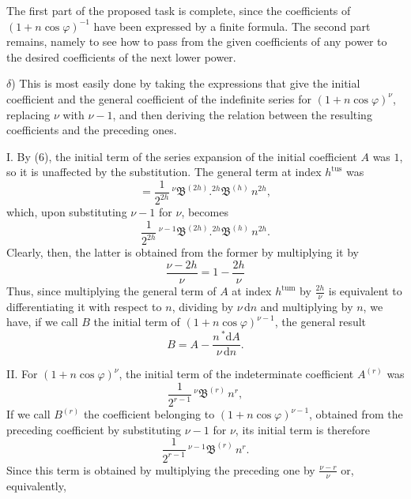 The first part of the proposed task is complete, since the coefficients of $(1+n\cos\varphi)^{-1}$ have been expressed by a finite formula. The second part remains, namely to see how to pass from the given coefficients of any power to the desired coefficients of the next lower power.

$\delta$) This is most easily done by taking the expressions that give the initial coefficient and the general coefficient of the indefinite series for $(1+n\cos\varphi)^{\nu}$, replacing $\nu$ with $\nu-1$, and then deriving the relation between the resulting coefficients and the preceding ones.

I. By (6), the initial term of the series expansion of the initial coefficient $A$ was $1$, so it is unaffected by the substitution. The general term at index $h^{\text{tus}}$ was
\[
= \frac{1}{2^{2h}}\,{}^{\nu}\mathfrak{B}^{(2h)} .  {}^{2h}\mathfrak{B}^{(h)}\,n^{2h},
\]
which, upon substituting $\nu-1$ for $\nu$, becomes
\[
\frac{1}{2^{2h}}\,{}^{\nu-1}\mathfrak{B}^{(2h)} .  {}^{2h}\mathfrak{B}^{(h)}\,n^{2h}.
\]
Clearly, then, the latter is obtained from the former by multiplying it by
\[
\frac{\nu-2h}{\nu} = 1-\frac{2h}{\nu}
\]
Thus, since multiplying the general term of $A$ at index $h^{\text{tum}}$ by $\frac{2h}{\nu}$ is equivalent to differentiating it with respect to $n$, dividing by $\nu\,\mathrm{d}n$ and multiplying by $n$, we have, if we call $B$ the initial term of $(1+n\cos\varphi)^{\nu-1}$, the general result
\[
B = A - \frac{n\,{}^{*}\!\mathrm{d}A}{\nu\,\mathrm{d}n}.
\]
\par\noindent\hspace*{\parindent}II. For $(1+n\cos\varphi)^{\nu}$, the initial term of the indeterminate coefficient $A^{(r)}$ was
\[
\frac{1}{2^{r-1}}\,{}^{\nu}\mathfrak{B}^{(r)}\,n^{r},
\]
If we call $B^{(r)}$ the coefficient belonging to $(1+n\cos\varphi)^{\nu-1}$, obtained from the preceding coefficient by substituting $\nu-1$ for $\nu$, its initial term is therefore
\[
\frac{1}{2^{r-1}}\,{}^{\nu-1}\mathfrak{B}^{(r)}\,n^{r}.
\]
Since this term is obtained by multiplying the preceding one by $\frac{\nu-r}{\nu}$ or, equivalently,
